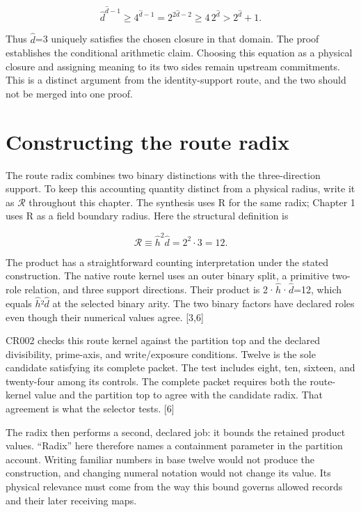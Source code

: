 \documentclass[10pt,twocolumn,letterpaper]{article}
\begin{document}
\begin{equation}
\hat d^{\hat d-1}\ge4^{\hat d-1}
=2^{2\hat d-2}\ge4\,2^{\hat d}>2^{\hat d}+1.
\end{equation}

Thus \(\hat d\)=3 uniquely satisfies the chosen closure in that domain. The proof establishes the conditional arithmetic claim. Choosing this equation as a physical closure and assigning meaning to its two sides remain upstream commitments. This is a distinct argument from the identity-support route, and the two should not be merged into one proof.

\section{Constructing the route radix}\label{constructing-the-route-radix}

The route radix combines two binary distinctions with the three-direction support. To keep this accounting quantity distinct from a physical radius, write it as \(\mathcal R\) throughout this chapter. The synthesis uses R for the same radix; Chapter 1 uses R as a field boundary radius. Here the structural definition is

\begin{equation}
\mathcal R\equiv\hat h^2\hat d
=2^2\cdot3=12.
\end{equation}

The product has a straightforward counting interpretation under the stated construction. The native route kernel uses an outer binary split, a primitive two-role relation, and three support directions. Their product is 2·\(\hat h\)·\(\hat d\)=12, which equals \(\hat h\)²\(\hat d\) at the selected binary arity. The two binary factors have declared roles even though their numerical values agree. {[}3,6{]}

CR002 checks this route kernel against the partition top and the declared divisibility, prime-axis, and write/exposure conditions. Twelve is the sole candidate satisfying its complete packet. The test includes eight, ten, sixteen, and twenty-four among its controls. The complete packet requires both the route-kernel value and the partition top to agree with the candidate radix. That agreement is what the selector tests. {[}6{]}

The radix then performs a second, declared job: it bounds the retained product values. ``Radix'' here therefore names a containment parameter in the partition account. Writing familiar numbers in base twelve would not produce the construction, and changing numeral notation would not change its value. Its physical relevance must come from the way this bound governs allowed records and their later receiving maps.
\end{document}
